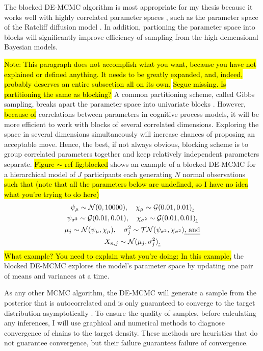 \documentclass[12pt]{article}
\newcommand{\trish}[1]{\textrm{\hl{#1}}}
\begin{document}
The blocked DE-MCMC algorithm is most appropriate for my
thesis because it works well with highly correlated parameter spaces
\citep{TurSed2013}, such as the parameter space of the
Ratcliff diffusion model \citep{RatTue2002}. In addition, partioning the parameter space into blocks  will significantly improve efficiency of sampling from the high-demensional Bayesian models.

\trish{Note: This paragraph does not accomplish what you want, because
you have not explained or defined anything. It needs to be greatly
expanded, and, indeed, probably deserves an entire subsection all on
its own.}
%
\trish{Segue missing.  Is partitioning the same as blocking?} A common
partitioning scheme, called Gibbs sampling, breaks apart the parameter
space into univariate blocks
\citep{RobCas2004,GamLop2006,GelCar2013}. However, \trish{because of}
correlations between parameters in cognitive process models, it will
be more efficient to work with blocks of several correlated
dimensions. Exploring the space in several dimensions simultaneously
will increase chances of proposing an acceptable move. Hence, the
best, if not always obvious, blocking scheme is to group correlated
parameters together and keep relatively independent parameters
separate. \trish{Figure $\sim$ ref fig:blocked} shows an example of a
blocked DE-MCMC for a hierarchical model of $J$ participants each
generating $N$ normal observations \trish{such that (note that all the
parameters below are undefined, so I have no idea what you're trying
to do here)}
%
\begin{gather}
\psi_{\mu} \sim \mathcal{N}(0, 10000), \quad 
\chi_{\mu} \sim \mathcal{G}(0.01,0.01)\trish{,} \nonumber \\
\psi_{\sigma^2} \sim \mathcal{G}(0.01, 0.01), 
\quad \chi_{\sigma^2} \sim \mathcal{G}(0.01,0.01)\trish{,} \nonumber \\
\mu_j \sim \mathcal{N}(\psi_{\mu}, \chi_{\mu}), 
\quad \sigma_j^2 \sim \mathcal{TN}(\psi_{\sigma^2}, \chi_{\sigma^2})\trish{, and} \nonumber \\
X_{n, j} \sim \mathcal{N}(\mu_j, \sigma_j^2)\trish{.} \nonumber
\end{gather}
%
\trish{What example? You need to explain what you're doing: In this
example,} the blocked DE-MCMC explores the model's parameter space by
updating one pair of means and variances at a time.

As any other MCMC algorithm, the DE-MCMC will generate a sample from
the posterior that is autocorrelated and is only guaranteed to
converge to the target distribution asymptotically
\citep{RobCas2004,GamLop2006}. To ensure the quality of samples,
before calculating any inferences, I will use graphical and numerical
methods to diagnose convergence of chains to the target density. These
methods are heuristics that do not guarantee convergence, but their
failure guarantees failure of convergence.
    
\end{document}

